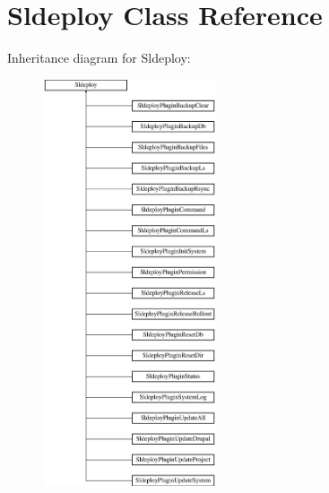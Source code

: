 \hypertarget{class_sldeploy}{
\section{Sldeploy Class Reference}
\label{class_sldeploy}
}
Inheritance diagram for Sldeploy:\begin{figure}[H]
\begin{center}
\leavevmode
\includegraphics[height=12.000000cm]{class_sldeploy}
\end{center}
\end{figure}
